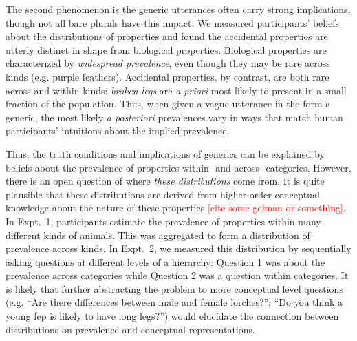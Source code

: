 \documentclass[10pt,letterpaper]{article}
\newcommand{\red}[1]{\textcolor{Red}{#1}}
\begin{document}
The second phenomenon is the generic utterances often carry strong implications, though not all bare plurals have this impact. 
We measured participants' beliefs about the distributions of properties and found the accidental properties are utterly distinct in shape from biological properties.
Biological properties are characterized by \emph{widespread prevalence}, even though they may be rare across kinds (e.g. purple feathers).
Accidental properties, by contrast, are both rare across and within kinds: \emph{broken legs} are \emph{a priori} most likely to present in a small fraction of the population.
Thus, when given a vague utterance in the form a generic, the most likely \emph{a posteriori} prevalences vary in ways that match human participants' intuitions about the implied prevalence.

Thus, the truth conditions and implications of generics can be explained by beliefs about the prevalence of properties within- and across- categories. 
However, there is an open question of where \emph{these distributions} come from. 
It is quite plausible that these distributions are derived from higher-order conceptual knowledge about the nature of these properties \red{[cite some gelman or something]}.
In Expt.~1, participants estimate the prevalence of properties within many different kinds of animals. 
This was aggregated to form a distribution of prevalence across kinds.
In Expt.~2, we measured this distribution by sequentially asking questions at different levels of a hierarchy: Question 1 was about the prevalence across categories while Question 2 was a question within categories. 
It is likely that further abstracting the problem to more conceptual level questions (e.g. ``Are there differences between male and female lorches?''; ``Do you think a young fep is likely to have long legs?'') would elucidate the connection between distributions on prevalence and conceptual representations. 
\end{document}
